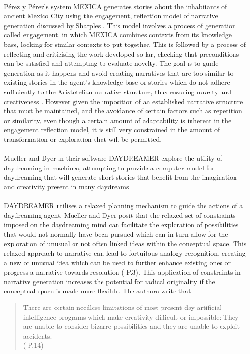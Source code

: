 \documentclass[letterpaper]{article}
\begin{document}
\\P\'erez y P\'erez's system MEXICA  generates stories about the inhabitants of ancient Mexico City using the engagement, reflection model  of narrative generation discussed by Sharples . This model involves a process of generation called engagement, in which MEXICA combines contexts from its knowledge base, looking for similar contexts to put together. This is followed by a process of reflecting and criticising the work developed so far, checking that preconditions can be satisfied and attempting to evaluate novelty. The goal is to guide generation as it happens and avoid creating narratives that are too similar to existing stories in the agent's knowledge base or stories which do not adhere sufficiently to the Aristotelian narrative structure, thus ensuring novelty and creativeness . However given the imposition of an established narrative structure that must be maintained, and the avoidance of certain factors such as repetition or similarity, even though a certain amount of adaptability is inherent in the engagement reflection model, it is still very constrained in the amount of transformation or exploration that will be permitted.\\
\\Mueller and Dyer in their software DAYDREAMER explore the utility of daydreaming in machines, attempting to provide a computer model for daydreaming that will generate short stories that benefit from the imagination and creativity present in many daydreams .\\
\\DAYDREAMER utilises a relaxed planning mechanism to guide the actions of a daydreaming agent. Mueller and Dyer posit that the relaxed set of constraints imposed on the daydreaming mind can facilitate the exploration of possibilities that would not normally have been pursued which can in turn allow for the exploration of unusual or not often linked ideas within the conceptual space. This relaxed approach to narrative can lead to fortuitous analogy recognition, creating a new or unusual idea which can be used to further enhance existing ones or progress a narrative towards resolution ( P.3). This application of constraints in narrative generation increases the potential for radical originality if the conceptual space is made more flexible. The authors write that
\begin{quote}
There are certain needless limitations of most present-day artificial intelligence programs which make creativity difficult or impossible: They are unable to consider bizarre possibilities and they are unable to exploit accidents.\\
( P.14)
\end{quote}
\end{document}
